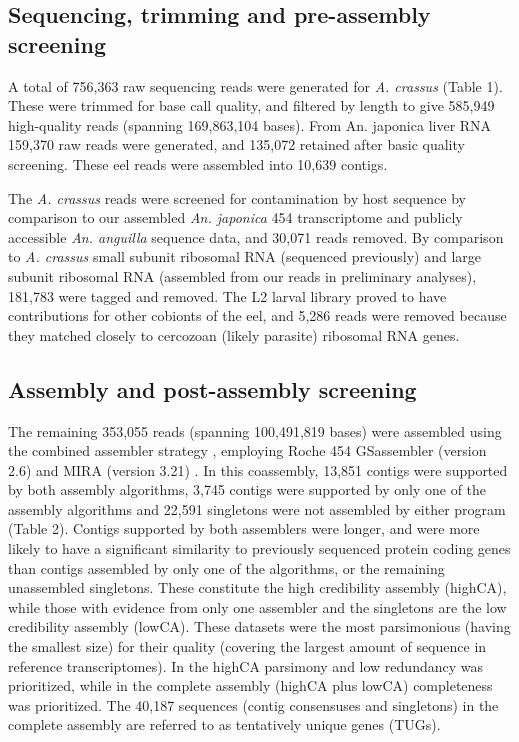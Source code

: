 \documentclass[10pt]{bmc_article}
\newenvironment{bmcformat}{\begin{raggedright}\baselineskip20pt\sloppy\setboolean{publ}{false}}{\end{raggedright}\baselineskip20pt\sloppy}
\begin{document}
\begin{bmcformat}
 \subsection*{Sequencing, trimming and pre-assembly screening}







A total of 756,363 raw sequencing reads
were generated for \textit{A. crassus} (Table 1). These were trimmed
for base call quality, and filtered by length to give
585,949 high-quality reads (spanning
169,863,104 bases). From An. japonica liver RNA
159,370 raw reads were generated, and
135,072 retained after basic quality
screening. These eel reads were assembled into
10,639 contigs.

The \textit{A. crassus} reads were screened for contamination by host
sequence by comparison to our assembled \textit{An. japonica} 454
transcriptome and publicly accessible \textit{An. anguilla} sequence
data, and 30,071 reads removed. By
comparison to \textit{A. crassus} small subunit ribosomal RNA
(sequenced previously) and large subunit ribosomal RNA (assembled from
our reads in preliminary analyses),
181,783 were tagged and removed. The
L2 larval library proved to have contributions for other cobionts of
the eel, and 5,286 reads were
removed because they matched closely to cercozoan (likely parasite)
ribosomal RNA genes.

\subsection*{Assembly and post-assembly screening}


The remaining 353,055 reads (spanning
100,491,819 bases) were assembled using the combined assembler
strategy \cite{pmid20950480}, employing Roche 454 GSassembler (version
2.6) and MIRA (version 3.21) \cite{miraEST}. In this coassembly,
13,851 contigs were supported by both assembly algorithms,
3,745 contigs were supported by only one of the assembly
algorithms and 22,591 singletons were not assembled by
either program (Table 2). Contigs supported by both assemblers were
longer, and were more likely to have a significant similarity to
previously sequenced protein coding genes than contigs assembled by
only one of the algorithms, or the remaining unassembled
singletons. These constitute the high credibility assembly (highCA),
while those with evidence from only one assembler and the singletons
are the low credibility assembly (lowCA). These datasets were the most
parsimonious (having the smallest size) for their quality (covering
the largest amount of sequence in reference transcriptomes). In the
highCA parsimony and low redundancy was prioritized, while in the
complete assembly (highCA plus lowCA) completeness was
prioritized. The 40,187 sequences (contig consensuses and singletons)
in the complete assembly are referred to as tentatively unique genes
(TUGs).





\end{bmcformat}
\end{document}
